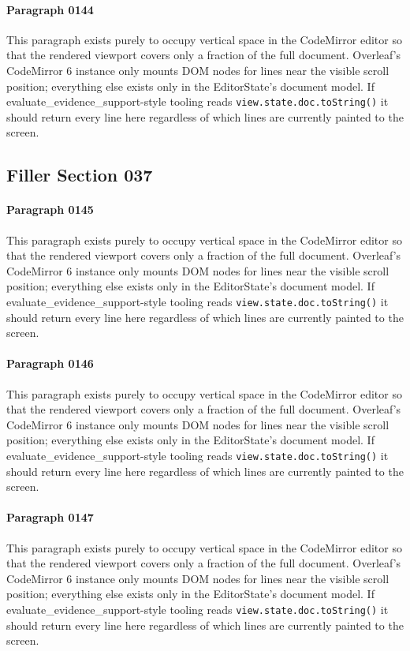 \documentclass{article}
\begin{document}
\paragraph{Paragraph 0144}
This paragraph exists purely to occupy vertical space in the CodeMirror editor so that the rendered viewport covers only a fraction of the full document. Overleaf's CodeMirror 6 instance only mounts DOM nodes for lines near the visible scroll position; everything else exists only in the EditorState's document model. If evaluate\_evidence\_support-style tooling reads \texttt{view.state.doc.toString()} it should return every line here regardless of which lines are currently painted to the screen.

\subsection{Filler Section 037}
\paragraph{Paragraph 0145}
This paragraph exists purely to occupy vertical space in the CodeMirror editor so that the rendered viewport covers only a fraction of the full document. Overleaf's CodeMirror 6 instance only mounts DOM nodes for lines near the visible scroll position; everything else exists only in the EditorState's document model. If evaluate\_evidence\_support-style tooling reads \texttt{view.state.doc.toString()} it should return every line here regardless of which lines are currently painted to the screen.

\paragraph{Paragraph 0146}
This paragraph exists purely to occupy vertical space in the CodeMirror editor so that the rendered viewport covers only a fraction of the full document. Overleaf's CodeMirror 6 instance only mounts DOM nodes for lines near the visible scroll position; everything else exists only in the EditorState's document model. If evaluate\_evidence\_support-style tooling reads \texttt{view.state.doc.toString()} it should return every line here regardless of which lines are currently painted to the screen.

\paragraph{Paragraph 0147}
This paragraph exists purely to occupy vertical space in the CodeMirror editor so that the rendered viewport covers only a fraction of the full document. Overleaf's CodeMirror 6 instance only mounts DOM nodes for lines near the visible scroll position; everything else exists only in the EditorState's document model. If evaluate\_evidence\_support-style tooling reads \texttt{view.state.doc.toString()} it should return every line here regardless of which lines are currently painted to the screen.
\end{document}
